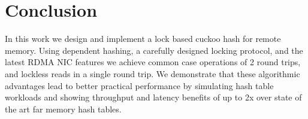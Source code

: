 \section{Conclusion}
\label{sec:conclusion}

In this work we design and implement a lock based cuckoo
hash for remote memory. Using dependent hashing, a carefully
designed locking protocol, and the latest RDMA NIC features
we achieve common case operations of 2 round trips, and
lockless reads in a single round trip. We demonstrate that
these algorithmic advantages lead to better practical
performance by simulating hash table workloads and showing
throughput and latency benefits of up to 2x over state of
the art far memory hash tables.